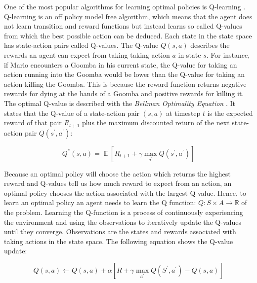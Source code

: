 \documentclass[notitlepage,a4paper,11pt]{article}
\newcommand{\R}{\mathbb{R}}
\DeclareMathOperator{\E}{\mathbb{E}}
\begin{document}
One of the most popular algorithms for learning optimal policies is Q-learning \cite{watkins1992q}. Q-learning is an off policy model free algorithm, which means that the agent does not learn transition and reward functions but instead learns so called Q-values from which the best possible action can be deduced. Each state in the state space has state-action pairs called Q-values. The Q-value $Q(s,a)$ describes the rewards an agent can expect from taking taking action $a$ in state $s$. For instance, if Mario encounters a Goomba in his current state, the Q-value for taking an action running into the Goomba would be lower than the Q-value for taking an action killing the Goomba. This is because the reward function returns negative rewards for dying at the hands of a Goomba and positive rewards for killing it. The optimal Q-value is described with the \textit{Bellman Optimality Equation} \cite{bellman1966dynamic}. It states that the Q-value of a state-action pair $(s,a)$ at timestep $t$ is the expected reward of that pair $R_{t+1}$ plus the maximum discounted return of the next state-action pair $Q(s^\prime, a^\prime)$:


\begin{equation}\label{eq:optimal_q}
Q^*(s,a) = \E \left[ R_{t+1} + \gamma \max\limits_{a^\prime} Q(s^\prime, a^\prime) \right]
\end{equation}


Because an optimal policy will choose the action which returns the highest reward and Q-values tell us how much reward to expect from an action, an optimal policy chooses the action associated with the largest Q-value. Hence, to learn an optimal policy an agent needs to learn the Q function: $Q : S \times A \to \R$ of the problem. Learning the Q-function is a process of continuously experiencing the environment and using the observations to iteratively update the Q-values until they converge. Observations are the states and rewards associated with taking actions in the state space. The following equation shows the Q-value update:

\begin{equation} \label{eq:q_update}
	Q(s,a) \gets Q(s,a) + \alpha \left[ R + \gamma \max\limits_{a^\prime} Q(S^\prime, a^\prime) - Q(s,a) \right]
\end{equation}
\end{document}
